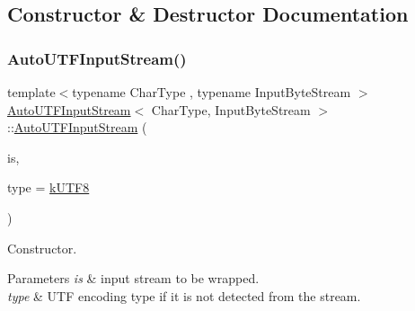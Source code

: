 \subsection{Constructor \& Destructor Documentation}
\mbox{\label{classAutoUTFInputStream_a83837fced0971ba26dd9a8ec1575abb0}} 
\subsubsection{\texorpdfstring{Auto\+U\+T\+F\+Input\+Stream()}{AutoUTFInputStream()}\hspace{0.1cm}{\footnotesize\ttfamily [1/2]}}
{\footnotesize\ttfamily template$<$typename Char\+Type , typename Input\+Byte\+Stream $>$ \\
\hyperlink{classAutoUTFInputStream}{Auto\+U\+T\+F\+Input\+Stream}$<$ Char\+Type, Input\+Byte\+Stream $>$\+::\hyperlink{classAutoUTFInputStream}{Auto\+U\+T\+F\+Input\+Stream} (\begin{DoxyParamCaption}\item[{Input\+Byte\+Stream \&}]{is,  }\item[{\hyperlink{encodings_8h_ac9448aedf514a5bb509bae73a9ce4e58}{U\+T\+F\+Type}}]{type = {\ttfamily \hyperlink{encodings_8h_ac9448aedf514a5bb509bae73a9ce4e58a7fd9945f1c494a4a4ee9446017e790f1}{k\+U\+T\+F8}} }\end{DoxyParamCaption})\hspace{0.3cm}{\ttfamily [inline]}}



Constructor. 


\begin{DoxyParams}{Parameters}
{\em is} & input stream to be wrapped. \\
\hline
{\em type} & U\+TF encoding type if it is not detected from the stream. \\
\hline
\end{DoxyParams}
\mbox{\label{classAutoUTFInputStream_a54001615e50304edf4a4ac1b2931f5d7}} 
